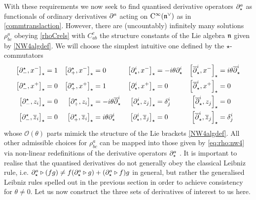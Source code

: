 With these requirements we now seek to find quantised derivative operators
$\partial_\star^a$ as functionals of ordinary derivatives $\partial^a$ acting on
${\rm C}^\infty({\mathfrak n}^\vee)$ as in \eqref{commtranslaction}. However, there are
(uncountably) infinitely many solutions $\rho^a_{ bc}$ obeying \eqref{rhoCrels}
\cite{DMT1} with $C_{ab}^{ c}$ the structure constants of the Lie algebra ${\mathfrak n}$
given by \eqref{NW4algdef}. We will choose the simplest intuitive one defined by
the $\star$-commutators
\begin{align}
  \nonumber
  \left[\partial_-^\star , x^-\right]_\star&=1
  &\left[\partial_+^\star , x^-\right]_\star&=0
  &\left[\partial_\star^i , x^-\right]_\star&=- i\theta \partial_\star^i
  &\left[ \overline{\partial}_\star^{ i} , x^-\right]_\star&=
   i\theta \overline{\partial}_\star^{ i}
  \\ \nonumber
  \left[\partial_-^\star , x^+\right]_\star&=0
  &\left[\partial_+^\star , x^+\right]_\star &=1
  &\left[\partial_\star^i , x^+\right]_\star&=0
  &\left[ \overline{\partial}_\star^{ i} , x^+\right]_\star&=0
  \\ \nonumber
  \left[\partial_-^\star , z_i\right]_\star&=0
  &\left[\partial_+^\star , z_i\right]_\star&=- i\theta 
  \overline{\partial}^{ i}_\star
  &\left[\partial_\star^i , z_j\right]_\star&=\delta^i_{ j}
  &\left[ \overline{\partial}_\star^{ i} , z_j\right]_\star&=0
  \\\nonumber
  \left[\partial_-^\star , \overline{z}_i\right]_\star&=0
  &\left[\partial_+^\star , \overline{z}_i\right]_\star&=
   i\theta \partial_\star^i
  &\left[\partial_\star^i , \overline{z}_j\right]_\star&=0
  &\left[ \overline{\partial}_\star^{ i} , \overline{z}_j\right]_\star&
  =\delta^i_{ j}
  \\
    \label{eq:rho:nw4}
\end{align}
whose ${\mathcal O}(\theta)$ parts mimick the structure of the Lie brackets
\eqref{NW4algdef}. All other admissible choices for $\rho^a_{ bc}$ can be mapped
into those given by \eqref{eq:rho:nw4} via non-linear redefinitions of the
derivative operators $\partial^a_\star$ \cite{DMT1}. It is important to realise that
the quantised derivatives do not generally obey the classical Leibniz rule, i.e.
$\partial_\star^a\triangleright(f g)\neq f (\partial_\star^a\triangleright
g)+(\partial_\star^a\triangleright f) g$ in general, but rather the generalised
Leibniz rules spelled out in the previous section in order to achieve
consistency for $\theta\neq0$. Let us now construct the three sets of
derivatives of interest to us here.

